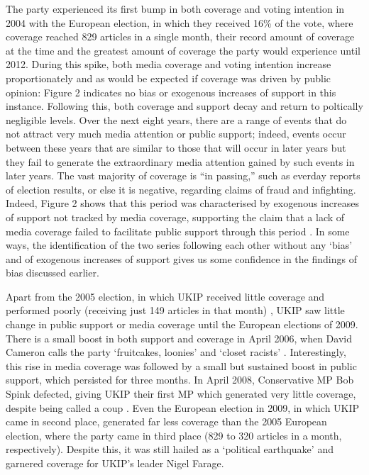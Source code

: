 \documentclass[12pt,]{article}
\begin{document}
The party experienced its first bump in both coverage and voting
intention in 2004 with the European election, in which they received
16\% of the vote, where coverage reached 829 articles in a single month,
their record amount of coverage at the time and the greatest amount of
coverage the party would experience until 2012. During this spike, both
media coverage and voting intention increase proportionately and as
would be expected if coverage was driven by public opinion: Figure 2
indicates no bias or exogenous increases of support in this instance.
Following this, both coverage and support decay and return to poltically
negligible levels. Over the next eight years, there are a range of
events that do not attract very much media attention or public support;
indeed, events occur between these years that are similar to those that
will occur in later years but they fail to generate the extraordinary
media attention gained by such events in later years. The vast majority
of coverage is ``in passing,'' such as everday reports of election
results, or else it is negative, regarding claims of fraud and
infighting. Indeed, Figure 2 shows that this period was characterised by
exogenous increases of support not tracked by media coverage, supporting
the claim that a lack of media coverage failed to facilitate public
support through this period \citep{ford_strategic_2012}. In some ways,
the identification of the two series following each other without any
`bias' and of exogenous increases of support gives us some confidence in
the findings of bias discussed earlier.

Apart from the 2005 election, in which UKIP received little coverage and
performed poorly (receiving just 149 articles in that month)
\citep{election_2005, morris_election_2005}, UKIP saw little change in
public support or media coverage until the European elections of 2009.
There is a small boost in both support and coverage in April 2006, when
David Cameron calls the party `fruitcakes, loonies' and `closet racists'
\citep{white_ukip_2006}. Interestingly, this rise in media coverage was
followed by a small but sustained boost in public support, which
persisted for three months. In April 2008, Conservative MP Bob Spink
defected, giving UKIP their first MP which generated very little
coverage, despite being called a coup \citep{winnett_tory_2008}. Even
the European election in 2009, in which UKIP came in second place,
generated far less coverage than the 2005 European election, where the
party came in third place (829 to 320 articles in a month,
respectively). Despite this, it was still hailed as a `political
earthquake' \citep{watt_european_2009} and garnered coverage for UKIP's
leader Nigel Farage.
\end{document}

